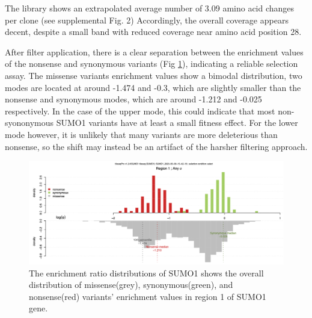 \documentclass{article}
\begin{document}


The library shows an extrapolated average number of 3.09 amino acid changes per clone (see supplemental Fig. 2) Accordingly, the overall coverage appears decent, despite a small band with reduced coverage near amino acid position 28. 



After filter application, there is a clear separation between the enrichment values of the nonsense and synonymous variants (Fig \ref{fig:BCE distribution}), indicating a reliable selection assay.
The missense variants enrichment values show a bimodal distribution, two modes are located at around -1.474 and  -0.3, which are slightly smaller than the nonsense and synonymous modes, which are around -1.212 and -0.025 respectively. In the case of the upper mode, this could indicate that most non-syononymous SUMO1 variants have at least a small fitness effect. For the lower mode however, it is unlikely that many variants are more deleterious than nonsense, so the shift may instead be an artifact of the harsher filtering approach.
\begin{figure}[H]
    \centering
    \includegraphics[width =.8\textwidth]{Figures/SUMO1/BCE.png}
    \caption{The enrichment ratio distributions of SUMO1 shows the overall distribution of missense(grey), synonymous(green), and nonsense(red) variants' enrichment values in region 1 of SUMO1 gene. }
    \label{fig:BCE distribution}
\end{figure}
\end{document}
